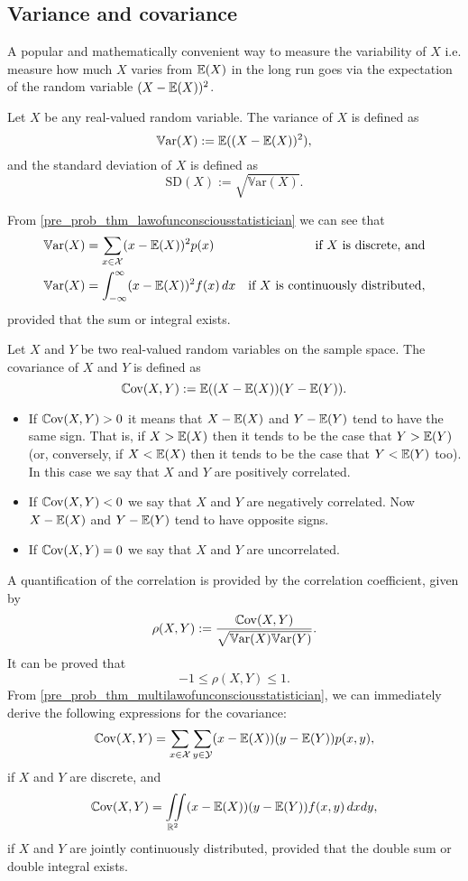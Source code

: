 \documentclass[10pt, a4paper]{article}
\begin{document}
\subsection{Variance and covariance}
A popular and mathematically convenient way to measure the variability of $X$ i.e. measure how much $X$ varies from $\mathbb{E}(X)$ in the long run goes via the expectation of the random variable $(X - \mathbb{E}(X)) ^ 2$.

\begin{definition}
    Let $X$ be any real-valued random variable.
    The variance of $X$ is defined as
    \[
    \mathbb{V}\mathrm{ar}(X) := \mathbb{E}((X - \mathbb{E}(X)) ^ 2),
    \]
    and the standard deviation of $X$ is defined as
    \[
    \mathrm{SD}(X) := \sqrt{\mathbb{V}\mathrm{ar}(X)}.
    \]
\end{definition}

From \autoref{pre_prob_thm_lawofunconsciousstatistician} we can see that
\begin{align*}
    \mathbb{V}\mathrm{ar}(X) &= \sum_{x \in \mathcal{X}}(x - \mathbb{E}(X)) ^ 2p(x)&\text{if $X$ is discrete, and} \\
    \mathbb{V}\mathrm{ar}(X) &= \int_{-\infty}^{\infty}(x - \mathbb{E}(X)) ^ 2f(x)\,dx&\text{if $X$ is continuously distributed},
\end{align*}
provided that the sum or integral exists.

\begin{definition}[Covariance]
    Let $X$ and $Y$ be two real-valued random variables on the sample space.
    The covariance of $X$ and $Y$ is defined as
    \[
    \mathbb{C}\mathrm{ov}{(X, Y)} := \mathbb{E}((X - \mathbb{E}(X))(Y - \mathbb{E}(Y)).
    \]
\end{definition}
\begin{itemize}
    \item If $\mathbb{C}\mathrm{ov}(X, Y) > 0$ it means that $X - \mathbb{E}(X)$ and $Y - \mathbb{E}(Y)$ tend to have the same sign.
    That is,
    if $X > \mathbb{E}(X)$ then it tends to be the case that $Y > \mathbb{E}(Y)$
    (or, conversely,
    if $X < \mathbb{E}(X)$ then it tends to be the case that $Y < \mathbb{E}(Y)$ too).
    In this case we say that $X$ and $Y$ are positively correlated.
    \item If $\mathbb{C}\mathrm{ov}(X, Y) < 0$ we say that $X$ and $Y$ are negatively correlated.
    Now $X - \mathbb{E}(X)$ and $Y - \mathbb{E}(Y)$ tend to have opposite signs.
    \item If $\mathbb{C}\mathrm{ov}(X, Y) = 0$ we say that $X$ and $Y$ are uncorrelated.
\end{itemize}

A quantification of the correlation is provided by the correlation coefficient,
given by
\[
\rho(X, Y) := \frac{\mathbb{C}\mathrm{ov}(X, Y)}{\sqrt{\mathbb{V}\mathrm{ar}(X)\mathbb{V}\mathrm{ar}(Y)}}.
\]
It can be proved that
\[
-1 \leq \rho(X, Y) \leq 1.
\]
From \autoref{pre_prob_thm_multilawofunconsciousstatistician},
we can immediately derive the following expressions for the covariance:
\[
\mathbb{C}\mathrm{ov}(X, Y) = \sum_{x \in \mathcal{X}}\sum_{y \in \mathcal{Y}}(x - \mathbb{E}(X))(y - \mathbb{E}(Y))p(x, y),
\]
if $X$ and $Y$ are discrete,
and
\[
\mathbb{C}\mathrm{ov}(X, Y) = \iint\limits_{\mathbb{R} ^ 2}(x - \mathbb{E}(X))(y - \mathbb{E}(Y))f(x, y)\,dxdy,
\]
if $X$ and $Y$ are jointly continuously distributed,
provided that the double sum or double integral exists.
\end{document}
